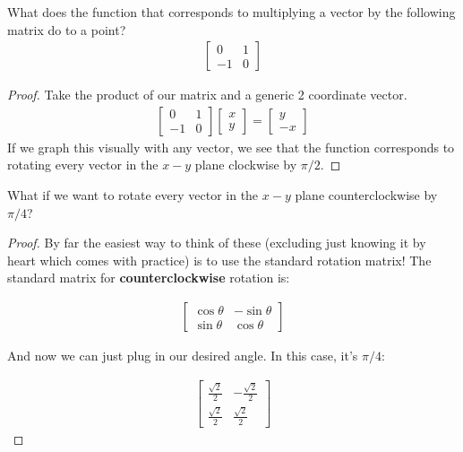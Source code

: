 \documentclass[11pt]{article}
\begin{document}
\begin{examplebox}{}
    What does the function that corresponds to multiplying a vector by the following matrix do to a point?
    \begin{align*}
        \begin{bmatrix}
            0 & 1 \\
            -1 & 0
        \end{bmatrix}
    \end{align*}
\end{examplebox}

\begin{proof}
    Take the product of our matrix and a generic 2 coordinate vector.
    \begin{align*}
        \begin{bmatrix}
            0 & 1 \\
            -1 & 0
        \end{bmatrix}
        \begin{bmatrix}
            x \\
            y
        \end{bmatrix}
        =
        \begin{bmatrix}
            y \\
            -x
        \end{bmatrix}
    \end{align*}
    If we graph this visually with any vector, we see that the function corresponds to rotating every vector in the $x-y$ plane clockwise by $\pi/2$.
\end{proof}

\begin{examplebox}{}
    What if we want to rotate every vector in the $x-y$ plane counterclockwise by $\pi/4$?
\end{examplebox}

\begin{proof}
    By far the easiest way to think of these (excluding just knowing it by heart which comes with practice) is to use the standard rotation matrix! The standard matrix for \textbf{counterclockwise} rotation is:

    \begin{align*}
        \begin{bmatrix}
            \cos\theta & -\sin\theta \\
            \sin\theta & \cos\theta
        \end{bmatrix}
    \end{align*}
    
    And now we can just plug in our desired angle. In this case, it's $\pi/4$:

    \begin{align*}
        \begin{bmatrix}
            \frac{\sqrt{2}}{2} & -\frac{\sqrt{2}}{2} \\
            \frac{\sqrt{2}}{2} & \frac{\sqrt{2}}{2}
        \end{bmatrix}
    \end{align*}
\end{proof}
\end{document}
